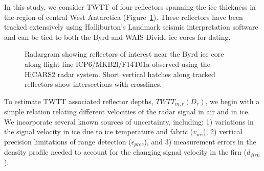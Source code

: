 In this study, we consider TWTT of four reflectors spanning the ice thickness in the region of central West Antarctica (Figure~\ref{fig:layergram}). These reflectors have been tracked extensively using Halliburton's Landmark seismic interpretation software and can be tied to both the Byrd and WAIS Divide ice cores for dating. %

\begin{figure}[h]\label{fig:layergram}
\centering
{}
\caption{Radargram showing reflectors of interest near the Byrd ice core along flight line ICP6/MKB2l/F14T01a observed using the HiCARS2 radar system. Short vertical hatches along tracked reflectors show intersections with crosslines.}
\end{figure}


To estimate TWTT associated reflector depths, $TWTT_{m,r}(D_r)$, we begin with a simple relation relating different velocities of the radar signal in air and in ice. We incorporate several known sources of uncertainty, including: 1) variations in the signal velocity in ice due to ice temperature and fabric ($v_{ice}$), 2) vertical precision limitations of range detection ($\epsilon_{prec}$), and 3) measurement errors in the density profile needed to account for the changing signal velocity in the firn ($d_{firn}$):

